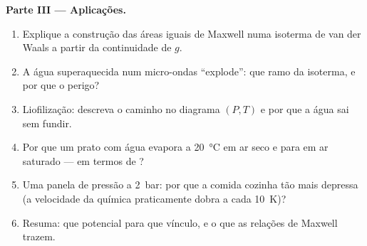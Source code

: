 \begin{problem}
\textbf{Parte III --- Aplicações.}
\begin{enumerate}[resume]
  \item Explique a construção das áreas iguais de Maxwell numa isoterma
        de van der Waals a partir da continuidade de $g$.
  \item A água superaquecida num micro-ondas ``explode'': que ramo da
        isoterma, e por que o perigo?
  \item Liofilização: descreva o caminho no diagrama $(P,T)$ e
        por que a água sai sem fundir.
  \item Por que um prato com água evapora a \qty{20}{\celsius} em ar seco
        e para em ar saturado --- em termos de ?
  \item Uma panela de pressão a \qty{2}{bar}: por que a comida cozinha tão
        mais depressa (a velocidade da química praticamente dobra a cada
        \qty{10}{K})?
  \item Resuma: que potencial para que vínculo, e o que as relações
        de Maxwell trazem.
\end{enumerate}
\end{problem}
